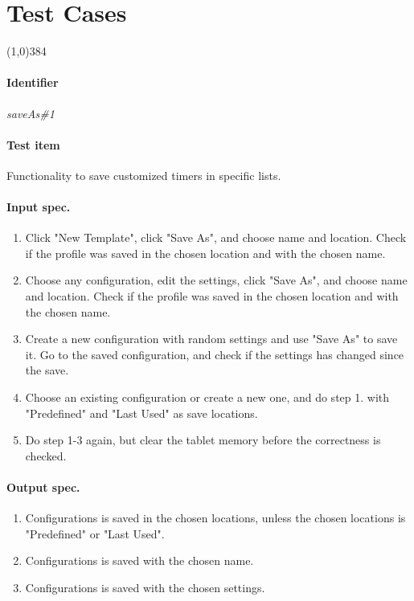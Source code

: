 \section{Test Cases}
\label{sec:test_cases}

\begin{center}
	\line(1,0){384}
\end{center}
\paragraph{Identifier}
	\textit{saveAs\#1}
\paragraph{Test item}
	Functionality to save customized timers in specific lists.
\paragraph{Input spec.}
	\begin{enumerate}
		\item Click "New Template", click "Save As", and choose name and location. Check if the profile was saved in the chosen location and with the chosen name.
		\item Choose any configuration, edit the settings, click "Save As", and choose name and location. Check if the profile was saved in the chosen location and with the chosen name.
		\item Create a new configuration with random settings and use "Save As" to save it. Go to the saved configuration, and check if the settings has changed since the save.
		\item Choose an existing configuration or create a new one, and do step 1. with "Predefined" and "Last Used" as save locations.
		\item Do step 1-3 again, but clear the tablet memory before the correctness is checked.
	\end{enumerate}
\paragraph{Output spec.}
	\begin{enumerate}
		\item Configurations is saved in the chosen locations, unless the chosen locations is "Predefined" or "Last Used".
		\item Configurations is saved with the chosen name.
		\item Configurations is saved with the chosen settings.
	\end{enumerate}
